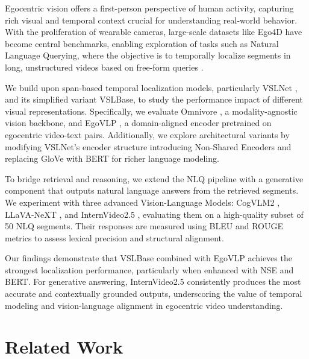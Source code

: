 \documentclass[10pt,twocolumn,letterpaper]{article}
\begin{document}
Egocentric vision offers a first-person perspective of human activity, capturing rich visual and temporal context crucial for understanding real-world behavior. With the proliferation of wearable cameras, large-scale datasets like Ego4D have become central benchmarks, enabling exploration of tasks such as Natural Language Querying, where the objective is to temporally localize segments in long, unstructured videos based on free-form queries \cite{1_Ego4D_Around_the_World_in_3000_Hours_of_Egocentric_Video}.

We build upon span-based temporal localization models, particularly VSLNet \cite{4_Span_based_Localizing_Network_for_Natural_Language_Video_Localization}, and its simplified variant VSLBase, to study the performance impact of different visual representations. Specifically, we evaluate Omnivore \cite{8_OMNIVORE_ASingle_Model_for_Many_Visual_Modalities}, a modality-agnostic vision backbone, and EgoVLP \cite{6_Egocentric_Video_Language_Pretraining}, a domain-aligned encoder pretrained on egocentric video-text pairs. Additionally, we explore architectural variants by modifying VSLNet’s encoder structure introducing Non-Shared Encoders and replacing GloVe with BERT for richer language modeling.

To bridge retrieval and reasoning, we extend the NLQ pipeline with a generative component that outputs natural language answers from the retrieved segments. We experiment with three advanced Vision-Language Models: CogVLM2 \cite{11_Liu2024CogVLM2_Visual_Language_Models_for_Image_and_Video_Understanding}, LLaVA-NeXT \cite{12_Liu2024LLaVANeXT_Tackling_Multi-image_Video_and_3D_in_Large_Multimodal_Models}, and InternVideo2.5 \cite{13_Wang2024InternVideo_InternVideo2.5_Empowering_Video_MLLMs_with_Long_and_Rich_Context_Modeling}, evaluating them on a high-quality subset of 50 NLQ segments. Their responses are measured using BLEU and ROUGE metrics to assess lexical precision and structural alignment.

Our findings demonstrate that VSLBase combined with EgoVLP achieves the strongest localization performance, particularly when enhanced with NSE and BERT. For generative answering, InternVideo2.5 consistently produces the most accurate and contextually grounded outputs, underscoring the value of temporal modeling and vision-language alignment in egocentric video understanding.



\section{Related Work}
\label{sec:relatedWork}
	
\end{document}
